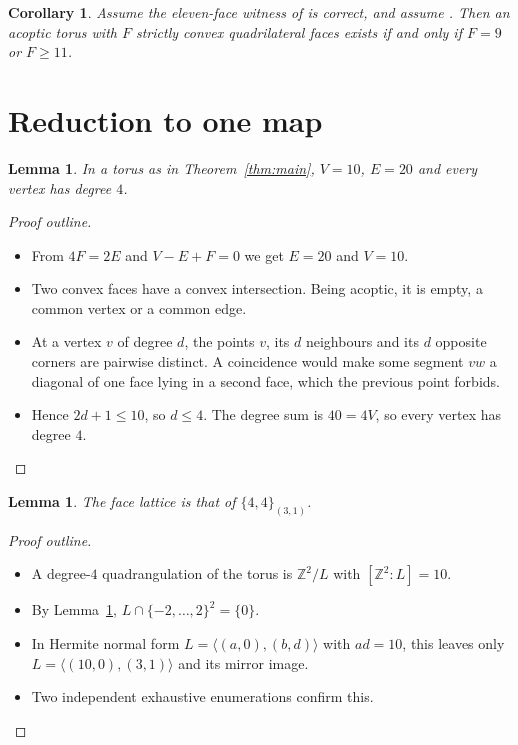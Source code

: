 \documentclass[11pt]{article}
\newtheorem{lemma}[theorem]{Lemma}
\newtheorem{corollary}[theorem]{Corollary}
\begin{document}
\begin{corollary}
Assume the eleven-face witness of \cite{Seamons} is correct, and assume \cite[Prop.~3.1]{GS}. Then an acoptic
torus with $F$ strictly convex quadrilateral faces exists if and only if $F=9$ or $F\ge 11$.
\end{corollary}

\section{Reduction to one map}
\begin{lemma}\label{lem:star}
In a torus as in Theorem~\ref{thm:main}, $V=10$, $E=20$ and every vertex has degree $4$.
\end{lemma}
\begin{proof}[Proof outline]
\begin{itemize}
\item From $4F=2E$ and $V-E+F=0$ we get $E=20$ and $V=10$.
\item Two convex faces have a convex intersection. Being acoptic, it is empty, a common vertex or a common edge.
\item At a vertex $v$ of degree $d$, the points $v$, its $d$ neighbours and its $d$ opposite corners are pairwise
  distinct. A coincidence would make some segment $vw$ a diagonal of one face lying in a second face, which the
  previous point forbids.
\item Hence $2d+1\le 10$, so $d\le 4$. The degree sum is $40=4V$, so every vertex has degree $4$.
\end{itemize}
\end{proof}

\begin{lemma}\label{lem:map}
The face lattice is that of $\{4,4\}_{(3,1)}$.
\end{lemma}
\begin{proof}[Proof outline]
\begin{itemize}
\item A degree-$4$ quadrangulation of the torus is $\mathbb{Z}^2/L$ with $[\mathbb{Z}^2:L]=10$.
\item By Lemma~\ref{lem:star}, $L\cap\{-2,\dots,2\}^2=\{0\}$.
\item In Hermite normal form $L=\langle(a,0),(b,d)\rangle$ with $ad=10$, this leaves only
  $L=\langle(10,0),(3,1)\rangle$ and its mirror image.
\item Two independent exhaustive enumerations confirm this.
\end{itemize}
\end{proof}
\end{document}
